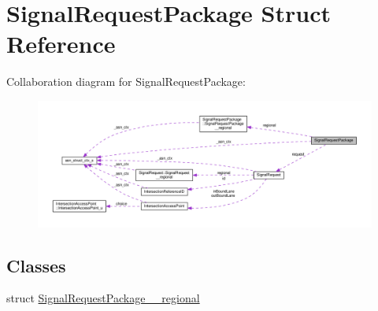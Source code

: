 \hypertarget{structSignalRequestPackage}{}\section{Signal\+Request\+Package Struct Reference}
\label{structSignalRequestPackage}


Collaboration diagram for Signal\+Request\+Package\+:\nopagebreak
\begin{figure}[H]
\begin{center}
\leavevmode
\includegraphics[width=350pt]{structSignalRequestPackage__coll__graph}
\end{center}
\end{figure}
\subsection*{Classes}
\begin{DoxyCompactItemize}
\item 
struct \hyperlink{structSignalRequestPackage_1_1SignalRequestPackage____regional}{Signal\+Request\+Package\+\_\+\+\_\+regional}
\end{DoxyCompactItemize}

